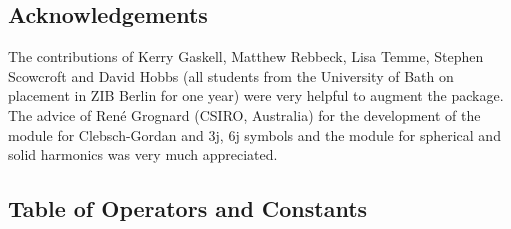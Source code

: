 \subsection{Acknowledgements}

The contributions of Kerry Gaskell, Matthew Rebbeck, Lisa Temme,
Stephen Scowcroft and David Hobbs (all students from the University of Bath
on placement in ZIB Berlin for one year) were very helpful
to augment the package. The advice of Ren\'e Grognard (CSIRO, Australia)
for the development of the module for Clebsch-Gordan and 3j, 6j symbols
and the module for spherical and solid harmonics was very much appreciated.

\subsection{Table of Operators and Constants}

